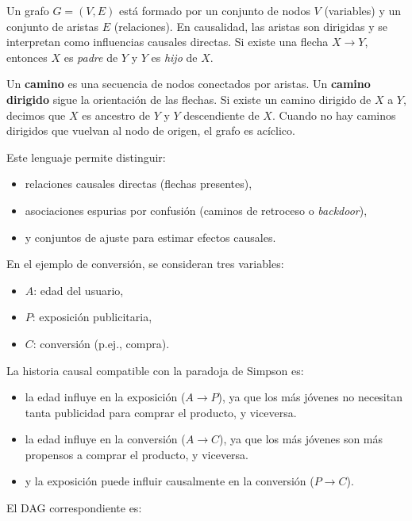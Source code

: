 \documentclass[12pt]{report} %
\begin{document}
Un grafo $G=(V,E)$ está formado por un conjunto de nodos $V$ (variables) y un conjunto de aristas $E$ (relaciones). En causalidad, las aristas son dirigidas y se interpretan como influencias causales directas. Si existe una flecha $X \to Y$, entonces $X$ es \textit{padre} de $Y$ y $Y$ es \textit{hijo} de $X$.

Un \textbf{camino} es una secuencia de nodos conectados por aristas. Un \textbf{camino dirigido} sigue la orientación de las flechas. Si existe un camino dirigido de $X$ a $Y$, decimos que $X$ es ancestro de $Y$ y $Y$ descendiente de $X$. Cuando no hay caminos dirigidos que vuelvan al nodo de origen, el grafo es acíclico.

Este lenguaje permite distinguir:
\begin{itemize}
    \item relaciones causales directas (flechas presentes),
    \item asociaciones espurias por confusión (caminos de retroceso o \textit{backdoor}),
    \item y conjuntos de ajuste para estimar efectos causales.
\end{itemize}

En el ejemplo de conversión, se consideran tres variables:
\begin{itemize}
    \item $A$: edad del usuario,
    \item $P$: exposición publicitaria,
    \item $C$: conversión (p.ej., compra).
\end{itemize}

La historia causal compatible con la paradoja de Simpson es:
\begin{itemize}
    \item la edad influye en la exposición ($A \to P$), ya que los más jóvenes no necesitan tanta publicidad para comprar el producto, y viceversa.
    \item la edad influye en la conversión ($A \to C$), ya que los más jóvenes son más propensos a comprar el producto, y viceversa.
    \item y la exposición puede influir causalmente en la conversión ($P \to C$).
\end{itemize}

El DAG correspondiente es:
\end{document}
